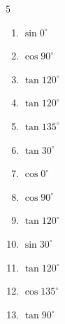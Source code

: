 \begin{multicols}{5}
\begin{enumerate}
  \item $\displaystyle \sin{0^\circ}$

        \phantom{$\displaystyle =0$}

  \item $\displaystyle \cos{90^\circ}$

        \phantom{$\displaystyle =0$}

  \item $\displaystyle \tan{120^\circ}$


  \item $\displaystyle \tan{120^\circ}$


  \item $\displaystyle \tan{135^\circ}$

        \phantom{$\displaystyle =-1$}

  \item $\displaystyle \tan{30^\circ}$


  \item $\displaystyle \cos{0^\circ}$

        \phantom{$\displaystyle =1$}

  \item $\displaystyle \cos{90^\circ}$

        \phantom{$\displaystyle =0$}

  \item $\displaystyle \tan{120^\circ}$


  \item $\displaystyle \sin{30^\circ}$


  \item $\displaystyle \tan{120^\circ}$


\columnbreak %

\resetques

  \item $\displaystyle \cos{135^\circ}$


  \item $\displaystyle \tan{90^\circ}$


\end{enumerate}
\end{multicols}
